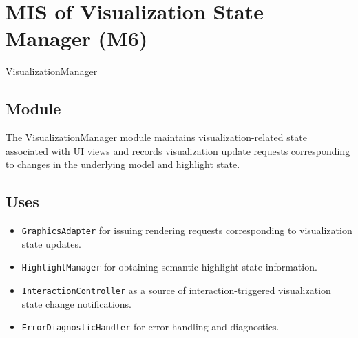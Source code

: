 \documentclass[12pt, titlepage]{article}
\begin{document}
\newpage

\section{MIS of Visualization State Manager (M6)}\label{Module8}

VisualizationManager

\subsection{Module}
The VisualizationManager module maintains visualization-related state associated with UI views and records visualization update requests corresponding to changes in the underlying model and highlight state.


\subsection{Uses}
\begin{itemize}
  \item \texttt{GraphicsAdapter} for issuing rendering requests corresponding to visualization state updates.
  \item \texttt{HighlightManager} for obtaining semantic highlight state information.
  \item \texttt{InteractionController} as a source of interaction-triggered visualization state change notifications.
  \item \texttt{ErrorDiagnosticHandler} for error handling and diagnostics.
\end{itemize}
\end{document}

